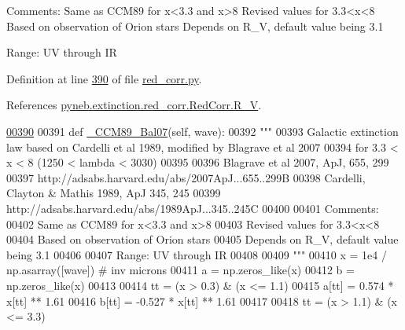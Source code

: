 \begin{DoxyVerb}
\begin{DoxyVerb}
Comments:
Same as CCM89 for x<3.3 and x>8
Revised values for 3.3<x<8
Based on observation of Orion stars
Depends on R_V, default value being 3.1

Range: UV through IR\end{DoxyVerb}
 

Definition at line \hyperlink{red__corr_8py_source_l00390}{390} of file \hyperlink{red__corr_8py_source}{red\-\_\-corr.\-py}.



References \hyperlink{red__corr_8py_source_l00204}{pyneb.\-extinction.\-red\-\_\-corr.\-Red\-Corr.\-R\-\_\-\-V}.


\begin{DoxyCode}
\hypertarget{classpyneb_1_1extinction_1_1red__corr_1_1_red_corr_l00390}{}\hyperlink{classpyneb_1_1extinction_1_1red__corr_1_1_red_corr_a5422d3b4c568033cc97ada0b73670aa9}{00390} 
00391     \textcolor{keyword}{def }\hyperlink{classpyneb_1_1extinction_1_1red__corr_1_1_red_corr_a5422d3b4c568033cc97ada0b73670aa9}{\_CCM89\_Bal07}(self, wave):
00392         \textcolor{stringliteral}{"""}
00393 \textcolor{stringliteral}{        Galactic extinction law based on Cardelli et al 1989, modified by Blagrave et al 2007 }
00394 \textcolor{stringliteral}{        for 3.3 < x < 8 (1250 < lambda < 3030)}
00395 \textcolor{stringliteral}{        }
00396 \textcolor{stringliteral}{        Blagrave et al 2007, ApJ, 655, 299 }
00397 \textcolor{stringliteral}{        http://adsabs.harvard.edu/abs/2007ApJ...655..299B}
00398 \textcolor{stringliteral}{        Cardelli, Clayton & Mathis 1989, ApJ 345, 245}
00399 \textcolor{stringliteral}{        http://adsabs.harvard.edu/abs/1989ApJ...345..245C}
00400 \textcolor{stringliteral}{}
00401 \textcolor{stringliteral}{        Comments:}
00402 \textcolor{stringliteral}{        Same as CCM89 for x<3.3 and x>8}
00403 \textcolor{stringliteral}{        Revised values for 3.3<x<8}
00404 \textcolor{stringliteral}{        Based on observation of Orion stars}
00405 \textcolor{stringliteral}{        Depends on R\_V, default value being 3.1}
00406 \textcolor{stringliteral}{}
00407 \textcolor{stringliteral}{        Range: UV through IR}
00408 \textcolor{stringliteral}{        }
00409 \textcolor{stringliteral}{        """}
00410         x = 1e4 / np.asarray([wave]) \textcolor{comment}{# inv microns}
00411         a = np.zeros\_like(x)
00412         b = np.zeros\_like(x)
00413         
00414         tt = (x > 0.3) & (x <= 1.1)
00415         a[tt] = 0.574 * x[tt] ** 1.61 
00416         b[tt] = -0.527 * x[tt] ** 1.61
00417     
00418         tt = (x > 1.1) & (x <= 3.3)

\end{DoxyCode}
\end{DoxyVerb}
